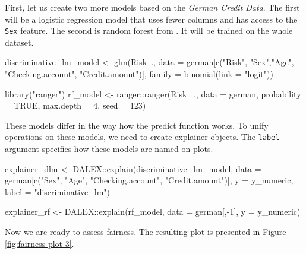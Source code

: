 First, let us create two more models based on the \emph{German Credit
Data}. The first will be a logistic regression model that uses fewer
columns and has access to the \texttt{Sex} feature. The second is random
forest from  \citep{ranger}. It will be trained on the
whole dataset.

\begin{Schunk}
\begin{Sinput}
discriminative_lm_model <- glm(Risk~.,
         data   = german[c("Risk", "Sex","Age",
                "Checking.account", "Credit.amount")],
         family = binomial(link = "logit"))

library("ranger")
rf_model <- ranger::ranger(Risk ~.,
         data = german, probability = TRUE,
         max.depth = 4, seed = 123)
\end{Sinput}
\end{Schunk}

These models differ in the way how the predict function works. To unify
operations on these models, we need to create  explainer
objects. The \texttt{label} argument specifies how these models are
named on plots.

\begin{Schunk}
\begin{Sinput}
explainer_dlm <- DALEX::explain(discriminative_lm_model,
        data = german[c("Sex", "Age", "Checking.account", "Credit.amount")],
        y = y_numeric,
        label = "discriminative_lm") 

explainer_rf <- DALEX::explain(rf_model, 
        data = german[,-1], y = y_numeric)
\end{Sinput}
\end{Schunk}

Now we are ready to assess fairness. The resulting plot is presented in
Figure \ref{fig:fairness-plot-3}.

